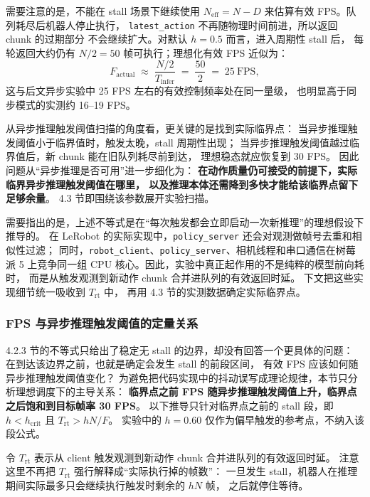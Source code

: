 需要注意的是，不能在 stall 场景下继续使用
$N_{\text{eff}}=N-D$ 来估算有效 FPS。队列耗尽后机器人停止执行，
\texttt{latest\_action} 不再随物理时间前进，所以返回 chunk 的过期部分
不会继续扩大。对默认 $h=0.5$ 而言，进入周期性 stall 后，
每轮返回大约仍有 $N/2=50$ 帧可执行；理想化有效 FPS 近似为：
\begin{equation}
  F_{\text{actual}} \;\approx\; \frac{N/2}{T_{\text{infer}}}
  \;=\; \frac{50}{2} \;=\; 25\ \text{FPS},
\end{equation}
这与后文异步实验中 25 FPS 左右的有效控制频率处在同一量级，
也明显高于同步模式的实测约 16--19 FPS。

从异步推理触发阈值扫描的角度看，更关键的是找到实际临界点：
当异步推理触发阈值小于临界值时，触发太晚，stall 周期性出现；
当异步推理触发阈值越过临界值后，新 chunk 能在旧队列耗尽前到达，
理想稳态就应恢复到 30 FPS。
因此问题从``异步推理是否可用''进一步细化为：
\textbf{在动作质量仍可接受的前提下，实际临界异步推理触发阈值在哪里，
以及推理本体还需降到多快才能给该临界点留下足够余量}。
4.3 节即围绕该参数展开实验扫描。

需要指出的是，上述不等式是在``每次触发都会立即启动一次新推理''的理想假设下推导的。
在 LeRobot 的实际实现中，\texttt{policy\_server} 还会对观测做帧号去重和相似性过滤；
同时，\texttt{robot\_client}、\texttt{policy\_server}、相机线程和串口通信在树莓派 5
上竞争同一组 CPU 核心。因此，实验中真正起作用的不是纯粹的模型前向耗时，
而是从触发观测到新动作 chunk 合并进队列的有效返回时延。
下文把这些实现细节统一吸收到 $T_{\text{rt}}$ 中，
再用 4.3 节的实测数据确定实际临界点。

\subsubsection{FPS 与异步推理触发阈值的定量关系}\label{sec:async-inf-fps-hold}

4.2.3 节的不等式只给出了稳定无 stall 的边界，却没有回答一个更具体的问题：
在到达该边界之前，也就是确定会发生 stall 的前段区间，
有效 FPS 应该如何随异步推理触发阈值变化？
为避免把代码实现中的抖动误写成理论规律，本节只分析理想调度下的主导关系：
\textbf{临界点之前 FPS 随异步推理触发阈值上升，临界点之后饱和到目标帧率 30 FPS}。
以下推导只针对临界点之前的 stall 段，即
$h<h_{\text{crit}}$ 且 $T_{\text{rt}}>hN/F$。
实验中的 $h=0.60$ 仅作为偏早触发的参考点，不纳入该段公式。

令 $T_{\text{rt}}$ 表示从 client 触发观测到新动作 chunk 合并进队列的有效返回时延。
注意这里不再把 $T_{\text{rt}}$ 强行解释成``实际执行掉的帧数''：
一旦发生 stall，机器人在推理期间实际最多只会继续执行触发时剩余的 $hN$ 帧，
之后就停住等待。

